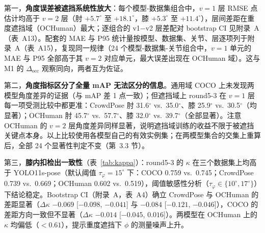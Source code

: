 \documentclass[10pt,conference]{IEEEtran}
\begin{document}
第一，\textbf{角度误差被遮挡系统性放大}：每个模型-数据集组合中，$v{=}1$ 层 RMSE 点估计均高于 $v{=}2$ 层（肘 $+5.7^{\circ}$ 至 $+18.1^{\circ}$，膝 $+5.3^{\circ}$ 至 $+11.4^{\circ}$），层间差距在重度遮挡域（OCHuman）最大；逐组合的 v1$-$v2 层差配对 bootstrap CI 见附录~A（表~A13）。配套的 MAE 与 P95 统计量按模型、数据集、关节、层逐项列于附录~A（表~A15），复现同一规律（24 个模型-数据集-关节组合中，$v{=}1$ 单元的 MAE 与 P95 全部高于其 $v{=}2$ 对应单元，最大误差出现在 OCHuman 域）。这与 M1 的 $\Delta_{\mathrm{occ}}$ 观察同向，两者互为佐证。

第二，\textbf{角度指标区分了全量 mAP 无法区分的信息}。通用域 COCO 上未发现两模型角度差异的证据（与 mAP 差 1 点一致）；但遮挡域上 round5-3 在 $v{=}1$ 层每一项受测比较中都更准：CrowdPose 肘 31.6$^{\circ}$ vs.\ 35.0$^{\circ}$、膝 25.9$^{\circ}$ vs.\ 30.5$^{\circ}$（均显著）；OCHuman 肘 45.7$^{\circ}$ vs.\ 57.7$^{\circ}$、膝 32.0$^{\circ}$ vs.\ 39.7$^{\circ}$（全部显著）。注意 OCHuman 的 $v{=}2$ 层角度差异同样显著，说明遮挡域训练的收益不限于被遮挡关键点本身。以上比较使用各模型自己的有效实例集；在两模型集合的交集上重算后，全部 24 个显著性判定不变（第~3.3 节）。

第三，\textbf{膝内扣检出一致性}（表~\ref{tab:kappa}）：round5-3 的 $\kappa$ 在三个数据集上均高于 YOLO11s-pose（默认阈值 $\tau_\varphi{=}15^{\circ}$ 下：COCO 0.759 vs.\ 0.745；CrowdPose 0.739 vs.\ 0.669；OCHuman 0.602 vs.\ 0.519），阈值敏感性分析（$\tau_\varphi\in\{10^{\circ},17^{\circ}\}$）下结论稳定。Bootstrap CI（附录~A，表~A4）确立 CrowdPose 与 OCHuman 的差距显著（$\Delta\kappa$ $-0.069$ [$-0.098$, $-0.041$] 与 $-0.084$ [$-0.121$, $-0.046$]），COCO 的差距方向一致但不显著（$\Delta\kappa$ $-0.014$ [$-0.045$, $0.016$]）。两模型在 OCHuman 上的 $\kappa$ 均偏低（$<0.61$），提示重度遮挡下 $\phi$ 的测量噪声上升。

\begin{table}[t]
\centering
\caption{膝内扣检出一致性（二值化 $\phi$ vs.\ GT）。粗体 $=$ 更高值（round5-3）；$\kappa$ 及模型差的 bootstrap CI 见附录~A。}
\label{tab:kappa}
\renewcommand{\arraystretch}{1.15}
\end{table}
\end{document}
